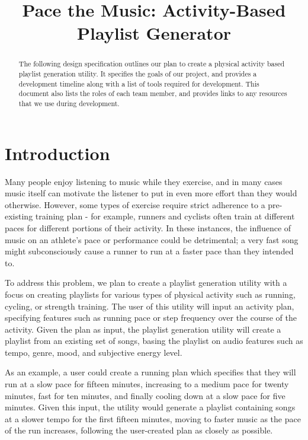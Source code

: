 \documentclass{article}
\title{Pace the Music: Activity-Based Playlist Generator}
\begin{document}
%
\maketitle
%
\begin{abstract}
The following design specification outlines our plan to create a physical activity based playlist generation utility. It specifies the goals of our project, and provides a development timeline along with a list of tools required for development. This document also lists the roles of each team member, and provides links to any resources that we use during development.
\end{abstract}

\section{Introduction}
Many people enjoy listening to music while they exercise, and in many cases music itself can motivate the listener to put in even more effort than they would otherwise. \cite{Shivar} However, some types of exercise require strict adherence to a pre-existing training plan - for example, runners and cyclists often train at different paces for different portions of their activity. In these instances, the influence of music on an athlete's pace or performance could be detrimental; a very fast song might subconsciously cause a runner to run at a faster pace than they intended to.

To address this problem, we plan to create a playlist generation utility with a focus on creating playlists for various types of physical activity such as running, cycling, or strength training. The user of this utility will input an activity plan, specifying features such as running pace or step frequency over the course of the activity. Given the plan as input, the playlist generation utility will create a playlist from an existing set of songs, basing the playlist on audio features such as tempo, genre, mood, and subjective energy level.

As an example, a user could create a running plan which specifies that they will run at a slow pace for fifteen minutes, increasing to a medium pace for twenty minutes, fast for ten minutes, and finally cooling down at a slow pace for five minutes. Given this input, the utility would generate a playlist containing songs at a slower tempo for the first fifteen minutes, moving to faster music as the pace of the run increases, following the user-created plan as closely as possible.
\end{document}
